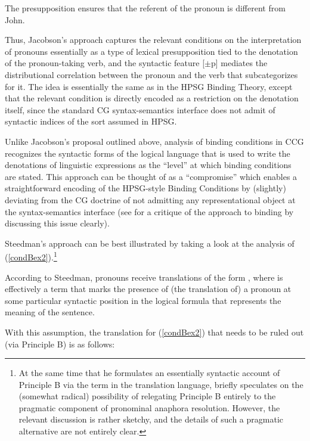 \documentclass[output=paper
                ,modfonts
                ,nonflat
	        ,collection
	        ,collectionchapter
	        ,collectiontoclongg
 	        ,biblatex
                ,babelshorthands
                ,newtxmath
                ,draftmode
                ,colorlinks, citecolor=brown
]{./langsci/langscibook}
\begin{document}
\noindent
The presupposition  %
{}%
ensures that the
referent of the pronoun is different from John.

Thus, Jacobson's approach captures the relevant conditions on the
interpretation of pronouns essentially as a type of lexical
presupposition tied to the denotation of the pronoun-taking verb,
and the syntactic feature [$\pm$p] mediates the
distributional correlation between the pronoun and the verb that
subcategorizes for it. The idea is
essentially the same as in the HPSG Binding Theory, except that the
relevant condition is directly encoded as a restriction on the
denotation itself, since the standard CG syntax-semantics interface
does not admit of syntactic indices of the sort assumed in HPSG.

Unlike Jacobson's proposal outlined above, 
analysis of binding conditions in CCG recognizes the syntactic forms
of the logical language that is used to write the denotations of
linguistic expressions as the ``level'' at which binding conditions are
stated. This approach can be thought of as a ``compromise'' which enables
a straightforward encoding of the HPSG-style Binding Conditions by
(slightly) deviating from the CG doctrine of not admitting any
representational object at the syntax-semantics interface (see
\citealt{Dowty97a-u} for a critique of
the approach to binding by \citealt{Steedman97a}
discussing this issue clearly).

Steedman's approach can be best illustrated by taking a look at the analysis of
(\ref{condBex2}).\footnote{At the same time that
he formulates an essentially syntactic account of Principle B via the
term  in the translation language, \citet{Steedman97a} briefly
speculates on the (somewhat radical) possibility of relegating Principle B entirely to
the pragmatic component of pronominal anaphora resolution. However,
the relevant discussion is rather sketchy, and the details of such a
pragmatic alternative are not entirely clear.}

\z
According to Steedman, pronouns receive translations of the form
, %
{}%
where  is effectively a term that marks the
presence of (the translation of) a pronoun at some particular
syntactic position in the logical formula that represents the meaning
of the sentence.

With this assumption, the translation for (\ref{condBex2}) that needs to be
ruled out (via Principle B) is as follows:
\end{document}
